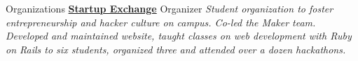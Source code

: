 \documentclass[a4paper,12pt]{article}
\begin{document}
\begin{resumeblock}{Organizations}
{{\footnotesize \textbf{ \href{http://startupexchange.gatech.edu/}{Startup Exchange} }}}\newline
\footnotesize{Organizer \hspace{.1in}%
\textit{
    Student organization to foster entrepreneurship and hacker culture on campus. Co-led the Maker team.
    Developed and maintained website, taught classes on web development with Ruby on Rails to six students,
    organized three and attended over a dozen hackathons.
}}
\end{resumeblock}


\pagebreak
\end{document}
